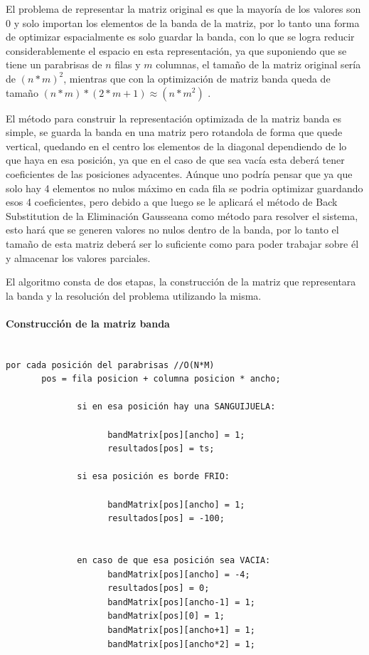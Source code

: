 El problema de representar la matriz original es que la mayoría de los valores son 0 y solo importan los elementos de la banda de la matriz, por lo tanto una forma de optimizar espacialmente es solo guardar la banda, con lo que se logra reducir considerablemente el espacio en esta representación, ya que suponiendo que se tiene un parabrisas de $n$ filas y $m$ columnas, el tamaño de la matriz original sería de $(n*m)^2$, mientras que con la optimización de matriz banda queda de tamaño $(n*m)*(2*m+1) \approx (n*m^2)$ .

El método para construir la representación optimizada de la matriz banda es simple, se guarda la banda en una matriz pero rotandola de forma que quede vertical, quedando en el centro los elementos de la diagonal dependiendo de lo que haya en esa posición, ya que en el caso de que sea vacía esta deberá tener coeficientes de las posiciones adyacentes.
Aúnque uno podría pensar que ya que solo hay 4 elementos no nulos máximo en cada fila se podria optimizar guardando esos 4 coeficientes, pero debido a que luego se le aplicará el método de Back Substitution de la Eliminación Gausseana como método para resolver el sistema, esto hará que se generen valores no nulos dentro de la banda, por lo tanto el tamaño de esta matriz deberá ser lo suficiente como para poder trabajar sobre él y almacenar los valores parciales.

El algoritmo consta de dos etapas, la construcción de la matriz que representara la banda y la resolución del problema utilizando la misma.

\paragraph{Construcción de la matriz banda}
\begin{verbatim}

por cada posición del parabrisas //O(N*M)
       pos = fila posicion + columna posicion * ancho;
		
              si en esa posición hay una SANGUIJUELA:
			
                    bandMatrix[pos][ancho] = 1;
                    resultados[pos] = ts;
		
              si esa posición es borde FRIO:
                    
                    bandMatrix[pos][ancho] = 1;
                    resultados[pos] = -100;


              en caso de que esa posición sea VACIA:
                    bandMatrix[pos][ancho] = -4;
                    resultados[pos] = 0;              
                    bandMatrix[pos][ancho-1] = 1;
                    bandMatrix[pos][0] = 1;
                    bandMatrix[pos][ancho+1] = 1;
                    bandMatrix[pos][ancho*2] = 1;
		

\end{verbatim}

